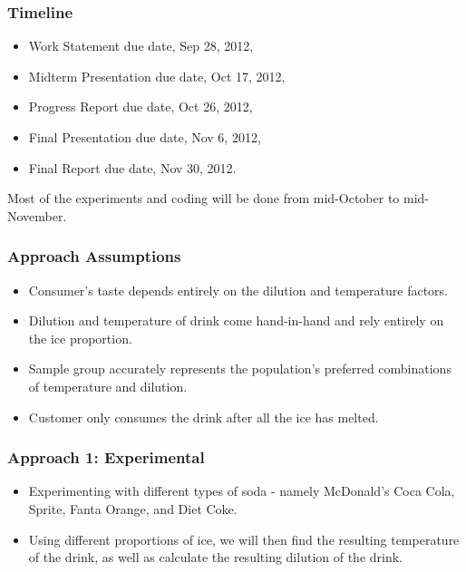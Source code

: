 \documentclass[compress,handout,10pt]{beamer}
\let\olditem\item
\renewcommand{\item}{\setlength{\itemsep}{0.5\baselineskip}\olditem}
\begin{document}
\begin{frame}
    \frametitle{Timeline}
\begin{itemize}
    \item Work Statement due date, Sep 28, 2012,
    \item Midterm Presentation due date, Oct 17, 2012,
    \item Progress Report due date, Oct 26, 2012,
    \item Final Presentation due date, Nov 6, 2012,
    \item Final Report due date, Nov 30, 2012.
\end{itemize}
\vspace{6pt} Most of the experiments and coding will be done from mid-October to mid-November.
\end{frame}


\begin{frame}
    \frametitle{Approach Assumptions}

\begin {itemize}
\item Consumer's taste depends entirely on the dilution and temperature factors.
\item Dilution and temperature of drink come hand-in-hand and rely entirely on the ice proportion.
\item Sample group accurately represents the population's preferred combinations of temperature and dilution.
\item Customer only consumes the drink after all the ice has melted.
\end{itemize}
\end{frame}

\begin{frame}
    \frametitle{Approach 1: Experimental}

\begin {itemize}
\item Experimenting with different types of soda - namely  McDonald's Coca Cola, Sprite, Fanta Orange, and Diet Coke.
\item Using different proportions of ice, we will then find the resulting temperature of the drink, as well as calculate the resulting dilution of the drink. 

\end{itemize}

\end{frame}
\end{document}
